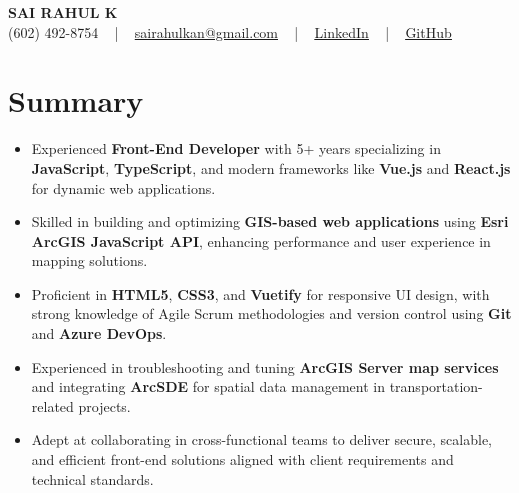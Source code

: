 \documentclass[letterpaper,11pt]{article}
\newcommand{\resumeItem}[1]{
  \item\footnotesize{
    {#1 \vspace{-2pt}}
  }
}
\newcommand{\resumeItemListStart}{\begin{itemize}[leftmargin=*]}
\newcommand{\resumeItemListEnd}{\end{itemize}\vspace{-5pt}}
\begin{document}
\begin{center}
    {\fontsize{14pt}{12pt}\selectfont \textbf{\MakeUppercase{Sai Rahul K}}}\\ \vspace{2pt}
    \fontsize{10pt}{12pt}\selectfont (602) 492-8754 ~ | ~ \href{mailto:sairahulkan@gmail.com}{sairahulkan@gmail.com} ~ | ~
    \href{https://www.linkedin.com/in/rq123/}{\color{blue}\underline{LinkedIn}} ~ | ~
    \href{https://github.com/kanrahuldo}{\color{blue}\underline{GitHub}}~
    \vspace{-8pt}
\end{center}

\section{Summary}
\fontsize{9pt}{10pt}\selectfont
\resumeItemListStart
    \resumeItem{Experienced \textbf{Front-End Developer} with 5+ years specializing in \textbf{JavaScript}, \textbf{TypeScript}, and modern frameworks like \textbf{Vue.js} and \textbf{React.js} for dynamic web applications.}
    \resumeItem{Skilled in building and optimizing \textbf{GIS-based web applications} using \textbf{Esri ArcGIS JavaScript API}, enhancing performance and user experience in mapping solutions.}
    \resumeItem{Proficient in \textbf{HTML5}, \textbf{CSS3}, and \textbf{Vuetify} for responsive UI design, with strong knowledge of Agile Scrum methodologies and version control using \textbf{Git} and \textbf{Azure DevOps}.}
    \resumeItem{Experienced in troubleshooting and tuning \textbf{ArcGIS Server map services} and integrating \textbf{ArcSDE} for spatial data management in transportation-related projects.}
    \resumeItem{Adept at collaborating in cross-functional teams to deliver secure, scalable, and efficient front-end solutions aligned with client requirements and technical standards.}
\resumeItemListEnd
\vspace{-6pt}
\end{document}
